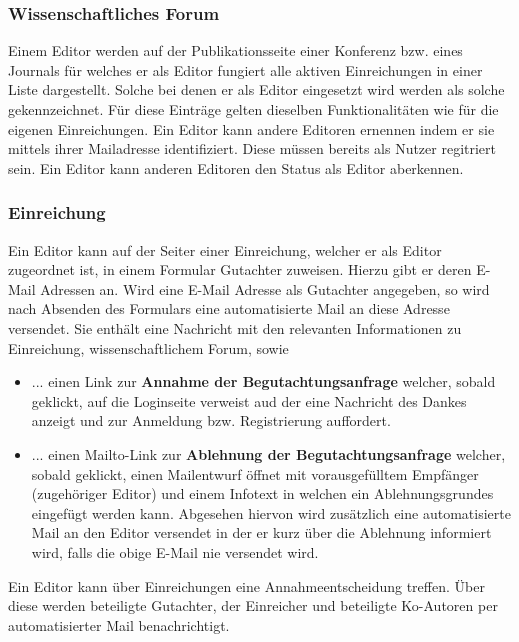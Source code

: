 \subsubsection{Wissenschaftliches Forum}
\begin{description}
    \XXitem{} Einem Editor werden auf der Publikationsseite einer Konferenz bzw. eines Journals für
    welches er als Editor fungiert alle aktiven Einreichungen in einer Liste dargestellt.
    Solche bei denen er als Editor eingesetzt wird werden als solche gekennzeichnet.
    Für diese Einträge gelten dieselben Funktionalitäten wie für die eigenen Einreichungen. %
    \XXitem{} Ein Editor kann andere Editoren ernennen indem er sie mittels ihrer Mailadresse identifiziert.
    Diese müssen bereits als Nutzer regitriert sein.
    \XXitem{} Ein Editor kann anderen Editoren den Status als Editor aberkennen.
\end{description}

\subsubsection{Einreichung}
\begin{description}
    \XXitem{} Ein Editor kann auf der Seiter einer Einreichung, welcher er als Editor zugeordnet ist,
    in einem Formular Gutachter zuweisen. Hierzu gibt er deren E-Mail Adressen an.
    \XXitem{} Wird eine E-Mail Adresse als Gutachter angegeben, so wird nach Absenden des Formulars
    eine automatisierte Mail an diese Adresse versendet. Sie enthält eine Nachricht mit den relevanten
    Informationen zu Einreichung, wissenschaftlichem Forum, sowie
    \begin{itemize}
        \item ... einen Link zur \textbf{Annahme der Begutachtungsanfrage} welcher, sobald geklickt,
        auf die Loginseite verweist aud der eine Nachricht des Dankes anzeigt und zur Anmeldung bzw.
        Registrierung auffordert.
        \item ... einen Mailto-Link zur \textbf{Ablehnung der Begutachtungsanfrage} welcher, sobald
        geklickt, einen Mailentwurf öffnet mit vorausgefülltem Empfänger (zugehöriger Editor)
        und einem Infotext in welchen ein Ablehnungsgrundes eingefügt werden kann.
        Abgesehen hiervon wird zusätzlich eine automatisierte Mail an den Editor versendet in der er
        kurz über die Ablehnung informiert wird, falls die obige E-Mail nie versendet wird.
    \end{itemize}
    \XXitem{} Ein Editor kann über Einreichungen eine Annahmeentscheidung treffen. Über diese werden
    beteiligte Gutachter, der Einreicher und beteiligte Ko-Autoren per automatisierter Mail benachrichtigt.
\end{description}

